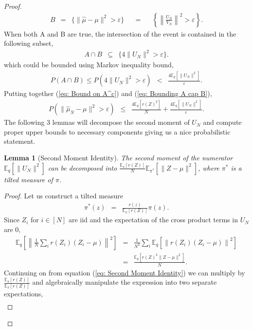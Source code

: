 \documentclass{article}
\newcommand{\E}{\mathbb{E}}
\newcommand{\amp}{\mathop{\:\:\,}\nolimits}
\theoremstyle{plain}
\newtheorem{lemma}[theorem]{Lemma}
\theoremstyle{definition}
\theoremstyle{remark}
\begin{document}
\begin{proof}
\begin{eqnarray}
    B & = & \{ \|\hat{\mu} - \mu\|^2 > \varepsilon\} \amp = \amp  \left\{ \left\|\frac{U_N}{V_N}\right\|^2 > \varepsilon\right\}.
\end{eqnarray}
When both A and B are true, the intersection of the event is contained in the following subset,
\begin{eqnarray}
    A \cap B &\subseteq& \{ 4 \|U_N\|^2 > \varepsilon\}. 
\end{eqnarray}
which could be bounded using Markov inequality bound, 
\begin{eqnarray}
    P(A \cap B) \leq P(4 \|U_N\|^2 > \varepsilon ) &<& \frac{4\E_q[\|U_N\|^2]}{\varepsilon}.\label{eq: Bounding A cap B}
\end{eqnarray}
Putting together (\ref{eq: Bound on A^c}) and (\ref{eq: Bounding A cap B}), 
\begin{eqnarray}
    P(\|\hat{\mu}_N - \mu\|^2 > \varepsilon) &\leq &\frac{4\E_q[r(Z)^2]}{N} + \frac{4\E_q[\|U_N\|^2]}{\varepsilon}. \label{eq: Probabilstic Bound}
\end{eqnarray}
The following 3 lemmas will decompose the second moment of $U_N$ and compute proper upper bounds to necessary components giving us a nice probabilistic statement. 
\begin{lemma}[Second Moment Identity]\label{lem: Second Moment Identity}
    The second moment of the numerator $\E_q[\|U_N\|^2]$ can be decomposed into $\frac{\E_\pi[r(Z)]}{N}\E_{\pi^*}[\|Z-\mu\|^2]$, where $\pi^*$ is a tilted measure of $\pi$.
\end{lemma}
\begin{proof}
    Let us construct a tilted measure
    \begin{eqnarray}
        \pi^*(z) &=& \frac{r(z)}{\E_\pi[r(Z)]}\pi(z).
    \end{eqnarray}
Since $Z_i$ for $ i \in [N]$ are iid and the expectation of the cross product terms in $U_N$ are 0, 
\begin{eqnarray}
    \E_q \left[\left\|\frac{1}{N}\sum_i r(Z_i)(Z_i-\mu)\right\|^2\right] &=& \frac{1}{N^2}\sum_i \E_q\left[\left\|r(Z_i)(Z_i-\mu)\right\|^2\right]\\&=&\frac{ \E_q[r(Z)^2\|Z-\mu\|^2]}{N}\label{eq: Second Moment Identity}.
\end{eqnarray}
Continuing on from equation (\ref{eq: Second Moment Identity}) we can multiply by $\frac{\E_\pi[r(Z)]}{\E_\pi[r(Z)]}$ and algebraically manipulate the expression into two separate expectations,
\begin{align}

\end{align}
\end{proof}
\end{proof}
\end{document}
